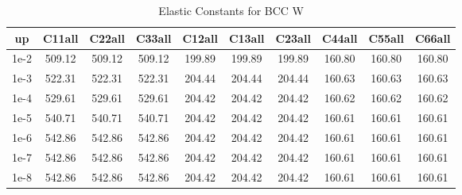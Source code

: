 \begin{table}[h!]
\centering
\begin{tabular}{|c|c|c|c|c|c|c|c|c|c|}
\hline
up& C11all & C22all & C33all & C12all & C13all & C23all & C44all & C55all & C66all \\
\hline
1e-2 & 509.12 & 509.12 & 509.12 & 199.89 & 199.89 & 199.89 & 160.80 & 160.80 & 160.80 \\
\hline
1e-3 & 522.31 & 522.31 & 522.31 & 204.44 & 204.44 & 204.44 & 160.63 & 160.63 & 160.63 \\
\hline
1e-4 & 529.61 & 529.61 & 529.61 & 204.42 & 204.42 & 204.42 & 160.62 & 160.62 & 160.62 \\
\hline
1e-5 & 540.71 & 540.71 & 540.71 & 204.42 & 204.42 & 204.42 & 160.61 & 160.61 & 160.61 \\
\hline
1e-6 & 542.86 & 542.86 & 542.86 & 204.42 & 204.42 & 204.42 & 160.61 & 160.61 & 160.61 \\
\hline
1e-7 & 542.86 & 542.86 & 542.86 & 204.42 & 204.42 & 204.42 & 160.61 & 160.61 & 160.61 \\
\hline
1e-8 & 542.86 & 542.86 & 542.86 & 204.42 & 204.42 & 204.42 & 160.61 & 160.61 & 160.61 \\
\hline
\end{tabular}
\caption{Elastic Constants for BCC W}
\label{tab:elastic_constants}
\end{table}
